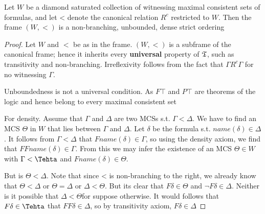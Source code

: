 \documentclass[11pt]{article}
\begin{document}
\begin{lemma}[]
Let \(W\) be a diamond saturated collection of witnessing maximal consistent
sets of formulas, and let < denote the canonical relation \(R^c\) restricted
to \(W\). Then the frame \((W,<)\) is a non-branching, unbounded, dense
strict ordering
\end{lemma}

\begin{proof}
Let \(W\) and \(<\) be as in the frame. \((W,<)\) is a subframe of the
canonical frame; hence it inherits every \textbf{universal} property of \(\mathfrak{T}\), such
as transitivity and non-branching. Irreflexivity follows from the fact that
\(\Gamma R^c\Gamma\) for no witnessing \(\Gamma\).

Unboundedness is not a universal condition. As \(F\top\) and \(P\top\) are
theorems of the logic and hence belong to every maximal consistent set

For density. Assume that \(\Gamma\) and \(\Delta\) are two MCSs s.t. \(\Gamma<\Delta\). We have to
find an MCS \(\Theta\) in \(W\) that lies between \(\Gamma\) and \(\Delta\). Let \(\delta\) be the formula s.t.
\(name(\delta)\in\Delta\). It follows from \(\Gamma<\Delta\) that
\(Fname(\delta)\in\Gamma\), so using the density axiom, we find that
\(FFname(\delta)\in\Gamma\). From this we may infer the existence of an MCS
\(\Theta\in W\) with \(\Gamma<\Tehta\) and \(Fname(\delta)\in\Theta\).

But is \(\Theta<\Delta\). Note that since < is non-branching to the right, we
already know that \(\Theta<\Delta\) or \(\Theta=\Delta\) or \(\Delta<\Theta\). But its
clear that \(F\delta\in\Theta\) and \(\neg F\delta\in\Delta\). Neither is it
possible that \(\Delta<\Theta\)for suppose otherwise. It would follows that
\(F\delta\in\Tehta\) that \(FF\delta\in\Delta\), so by transitivity axiom, \(F\delta\in\Delta\)
\end{proof}
\end{document}
